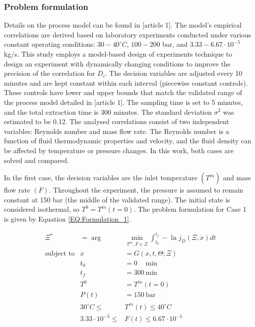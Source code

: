 \documentclass[../Article_Design_of_Experiment.tex]{subfiles}
\begin{document}
	\subsubsection{Problem formulation}
	
	Details on the process model can be found in [article 1]. The model's empirical correlations are derived based on laboratory experiments conducted under various constant operating conditions: $30 - 40^\circ C$, $100 - 200$ bar, and $3.33-6.67 \cdot 10^{-5}$ kg/s. This study employs a model-based design of experiments technique to design an experiment with dynamically changing conditions to improve the precision of the correlation for $D_i$. The decision variables are adjusted every 10 minutes and are kept constant within each interval (piecewise constant controls). These controls have lower and upper bounds that match the validated range of the process model detailed in [article 1]. The sampling time is set to 5 minutes, and the total extraction time is 300 minutes. The standard deviation $\sigma^2$ was estimated to be 0.12. The analysed correlations consist of two independent variables: Reynolds number and mass flow rate. The Reynolds number is a function of fluid thermodynamic properties and velocity, and the fluid density can be affected by temperature or pressure changes. In this work, both cases are solved and compared.
	
	In the first case, the decision variables are the inlet temperature $(T^{in})$ and mass flow rate $(F)$. Throughout the experiment, the pressure is assumed to remain constant at 150 bar (the middle of the validated range). The initial state is considered isothermal, so $T^0 = T^{in}(t=0)$. The problem formulation for Case 1 is given by Equation \ref{EQ:Formulation_1}.
	
	{\footnotesize
	\begin{equation}
		\begin{aligned} 
			&\Xi^* &= \arg &\min_{ T^{in}, F \in \Xi} \int_{t_0}^{t_f} - \ln j_D(\Xi,\dot{x}) dt  \\
			&\text{subject to}
			& \dot{x} &= G(x,t,\Theta;\Xi) \\
			&& t_0&=0\quad~\text{min} \\
			&& t_f&=300~\text{min} \\
			&& T^{0} &= T^{in}(t=0) \\
			&& P(t) &= 150~\text{bar} \\
			&& 30^\circ C \leq &T^{in}(t) \leq 40^\circ C \\
			&& 3.33 \cdot 10^{-5} \leq &F(t) \leq 6.67 \cdot 10^{-5}
		\end{aligned} \label{EQ:Formulation_1}
	\end{equation} } 
	
\end{document}
